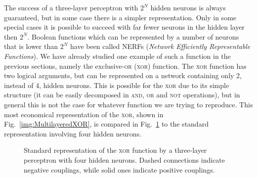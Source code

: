 The success of a three-layer perceptron with $2^N$ hidden neurons is always guaranteed, but in some case there is a simpler representation. Only in some special cases it is possible to succeed with far fewer neurons in the hidden layer then $2^N$. Boolean functions which can be represented by a number of neurons that is lower than $2^N$ have been called NERFs (\emph{Network Efficiently Representable Functions}). We have already studied one example of such a function in the previous sections, namely the exclusive-\textsc{or} (\textsc{xor}) function. The \textsc{xor} function has two logical arguments, but can be represented on a network containing only 2, instead of 4, hidden neurons. This is possible for the \textsc{xor} due to its simple structure (it can be easily decomposed in \textsc{and}, \textsc{or} and \textsc{not} operations), but in general this is not the case for whatever function we are trying to reproduce. This most economical representation of the \textsc{xor}, shown in Fig.~\ref{img:MultilayeredXOR}, is compared in Fig.~\ref{MultilayeredXORProof} to the standard representation involving four hidden neurons.
\begin{figure}[h!t]
\centering
{}
\caption{Standard representation of the \textsc{xor} function by a three-layer perceptron with four hidden neurons. Dashed connections indicate negative couplings, while solid ones indicate positive couplings.}\label{MultilayeredXORProof}
\end{figure}

